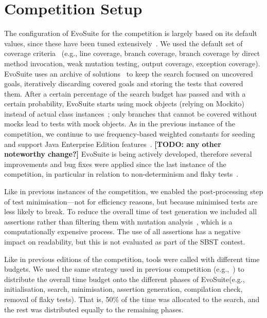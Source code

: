\documentclass[sigconf,table]{acmart}
\newcommand{\TODO}[1]{\textbf{\textcolor{ScarletRed}{[TODO: #1]}}\xspace}
\newcommand{\TODO}[1]{}
\newcommand{\EVOSUITE}{{\sc EvoSuite}\xspace}
\begin{document}


\section{Competition Setup}

The configuration of \EVOSUITE for the competition is largely based on
its default values, since these have been tuned
extensively~\cite{arcuri2013parameter}. We used the default set of
coverage criteria~\cite{rojas2015combining} (e.g., line coverage,
branch coverage, branch coverage by direct method invocation, weak
mutation testing, output coverage, exception coverage). \EVOSUITE uses
an archive of solutions~\cite{emse_archive} to keep the search focused
on uncovered goals, iteratively discarding covered goals and storing
the tests that covered them. After a certain percentage of the search
budget has passed and with a certain probability, \EVOSUITE starts
using mock objects (relying on Mockito) instead of actual class
instances~\cite{ICST_Mocking17}; only branches that cannot be covered
without mocks lead to tests with mock objects. As in the previous
instance of the competition, we continue to use frequency-based
weighted constants for seeding~\cite{sakti2015instance} and support
Java Enterprise Edition features~\cite{arcuri2016java}. \TODO{any
  other noteworthy change?} \EVOSUITE is being actively developed,
therefore several improvements and bug fixes were applied since the
last instance of the competition, in particular in relation to
non-determinism and flaky tests~\cite{arcuri2014automated}.

Like in previous instances of the competition, we enabled the
post-processing step of test minimisation---not for efficiency
reasons, but because minimised tests are less likely to break. To
reduce the overall time of test generation we included all assertions
rather than filtering them with mutation
analysis~\cite{10.1109/TSE.2011.93}, which is a computationally
expensive process. The use of all assertions has a negative impact on
readability, but this is not evaluated as part of the SBST contest.

Like in previous editions of the competition, tools were called with
different time budgets. We used the same strategy used in previous
competition (e.g.,~\cite{evosuiteAtSbst2016}) to distribute the overall time
budget onto the different phases of \EVOSUITE (e.g., initialisation,
search, minimisation, assertion generation, compilation check, removal
of flaky tests). That is, 50\% of the time was allocated to the
search, and the rest was distributed equally to the remaining phases.
\end{document}
